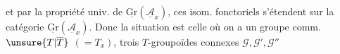 et par la propriété univ. de $\underline{\mathrm{Gr}}(\underline{\mathcal{A}}_x)$,
ces isom. fonctoriels s'étendent sur la catégorie
$\underline{\mathrm{Gr}}(\underline{\mathcal{A}}_x)$.
Donc la situation est celle où on a un groupe comm. $\unsure{T|\overline T}$ $(=T_x)$,
trois $T$-groupoïdes connexes $\mathcal{G},\mathcal{G}',\mathcal{G}''$




